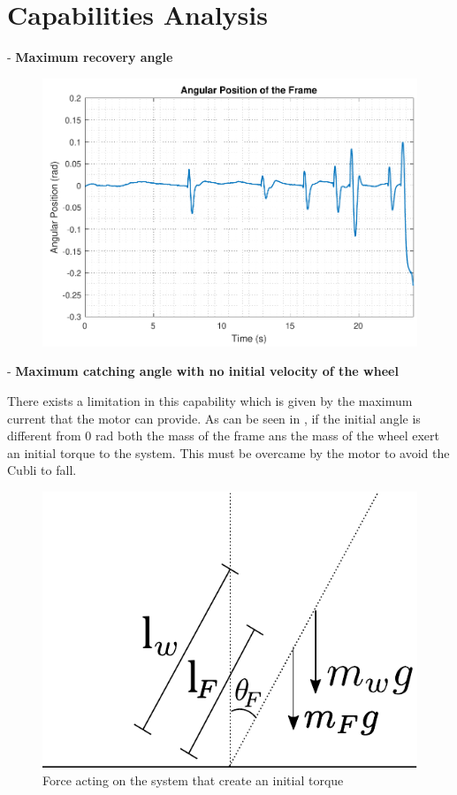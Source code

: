 \section{Capabilities Analysis}
- \textbf{Maximum recovery angle}
\begin{figure}[H]
	\centering
	\includegraphics[scale=0.65]{figures/testRecovery}
	\caption{}
	\label{testRecovery}
\end{figure}\vspace{-5mm}

- \textbf{Maximum catching angle with no initial velocity of the wheel}

There exists a limitation in this capability which is given by the maximum current that the motor can provide. As can be seen in , if the initial angle is different from 0 rad both the mass of the frame ans the mass of the wheel exert an initial torque to the system. This must be overcame by the motor to avoid the Cubli to fall.
%
\begin{figure}[H] 
	\centering
	\includegraphics[scale=0.65]{figures/limitationTorque}
	\caption{Force acting on the system that create an initial torque}
	\label{limitationTorque}
\end{figure}

